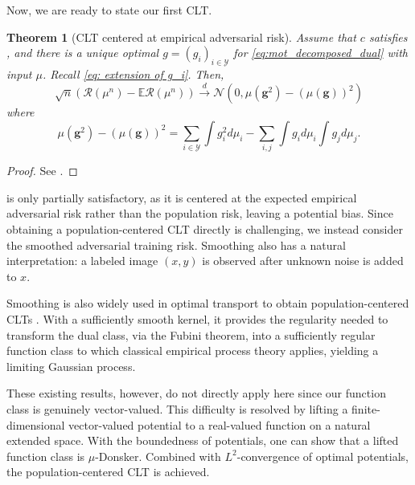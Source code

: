 \documentclass{amsart}
\theoremstyle{plain}
\numberwithin{equation}{section}\newtheorem{theorem}{Theorem}[section]
\theoremstyle{remark}
\begin{document}
Now, we are ready to state our first CLT.



\begin{theorem}[CLT centered at empirical adversarial risk]\label{thm: empirical centering}
Assume that $c$ satisfies , and there is a unique optimal $g=(g_i)_{i \in \mathcal{Y}}$ for \eqref{eq:mot_decomposed_dual} with input $\mu$. Recall \eqref{eq: extension of g_i}. Then,
\[
    \sqrt{n}(\mathscr{R}(\mu^n)- \mathbb{E}\mathscr{R}(\mu^n) ) \overset{d}{\longrightarrow} \mathcal{N} \left( 0, \mu(\bm{g}^2) - (\mu(\bm{g}) )^2 \right)
\]
where
\[
    \mu(\bm{g}^2) - (\mu(\bm{g}) )^2 = \sum_{i \in \mathcal{Y}} \int g_i^2 d\mu_i - \sum_{i,  j} \int g_i d\mu_i \int g_j d\mu_j.
\]
\end{theorem}    

\begin{proof}
See .    
\end{proof}



 is only partially satisfactory, as it is centered at the expected empirical adversarial risk rather than the population risk, leaving a potential bias. Since obtaining a population-centered CLT directly is challenging, we instead consider the smoothed adversarial training risk. Smoothing also has a natural interpretation: a labeled image $(x,y)$ is observed after unknown noise is added to $x$.

Smoothing is also widely used in optimal transport to obtain population-centered CLTs \cite{Goldfeldetal_2020, limit_pWasserstein2024, Goldfeld_Kato_Rioux_Sadhu2024}. With a sufficiently smooth kernel, it provides the regularity needed to transform the dual class, via the Fubini theorem, into a sufficiently regular function class to which classical empirical process theory applies, yielding a limiting Gaussian process.



These existing results, however, do not directly apply here since our function class is genuinely vector-valued. This difficulty is resolved by lifting a finite-dimensional vector-valued potential to a real-valued function on a natural extended space. With the boundedness of potentials, one can show that a lifted function class is $\mu$-Donsker. Combined with $L^2$-convergence of optimal potentials, the population-centered CLT is achieved.
\end{document}
